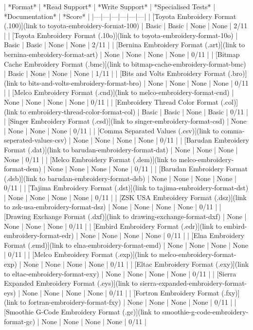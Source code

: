 \documentclass[a4paper, 11pt]{report}
\begin{document}
| *Format* | *Read Support* | *Write Support* | *Specialised Tests* | *Documentation* | *Score* |
|---|---|---|---|---|---|
| [Toyota Embroidery Format (.100)](link to toyota-embroidery-format-100) | Basic | Basic | None | None | 2/11 |
| [Toyota Embroidery Format (.10o)](link to toyota-embroidery-format-10o) | Basic | Basic | None | None | 2/11 |
| [Bernina Embroidery Format (.art)](link to bernina-embroidery-format-art) | None | None | None | None | 0/11 |
| [Bitmap Cache Embroidery Format (.bmc)](link to bitmap-cache-embroidery-format-bmc) | Basic | None | None | None | 1/11 |
| [Bits and Volts Embroidery Format (.bro)](link to bits-and-volts-embroidery-format-bro) | None | None | None | None | 0/11 |
| [Melco Embroidery Format (.cnd)](link to melco-embroidery-format-cnd) | None | None | None | None | 0/11 |
| [Embroidery Thread Color Format (.col)](link to embroidery-thread-color-format-col) | Basic | Basic | None | Basic | 0/11 |
| [Singer Embroidery Format (.csd)](link to singer-embroidery-format-csd) | None | None | None | None | 0/11 |
| [Comma Separated Values (.csv)](link to comma-seperated-values-csv) | None | None | None | None | 0/11 |
| [Barudan Embroidery Format (.dat)](link to barudan-embroidery-format-dat) | None | None | None | None | 0/11 |
| [Melco Embroidery Format (.dem)](link to melco-embroidery-format-dem) | None | None | None | None | 0/11 |
| [Barudan Embroidery Format (.dsb)](link to barudan-embroidery-format-dsb) | None | None | None | None | 0/11 |
| [Tajima Embroidery Format (.dst)](link to tajima-embroidery-format-dst) | None | None | None | None | 0/11 |
| [ZSK USA Embroidery Format (.dsz)](link to zsk-usa-embroidery-format-dsz) | None | None | None | None | 0/11 |
| [Drawing Exchange Format (.dxf)](link to drawing-exchange-format-dxf) | None | None | None | None | 0/11 |
| [Embird Embroidery Format (.edr)](link to embird-embroidery-format-edr) | None | None | None | None | 0/11 |
| [Elna Embroidery Format (.emd)](link to elna-embroidery-format-emd) | None | None | None | None | 0/11 |
| [Melco Embroidery Format (.exp)](link to melco-embroidery-format-exp) | None | None | None | None | 0/11 |
| [Eltac Embroidery Format (.exy)](link to eltac-embroidery-format-exy) | None | None | None | None | 0/11 |
| [Sierra Expanded Embroidery Format (.eys)](link to sierra-expanded-embroidery-format-eys) | None | None | None | None | 0/11 |
| [Fortron Embroidery Format (.fxy)](link to fortran-embroidery-format-fxy) | None | None | None | None | 0/11 |
| [Smoothie G-Code Embroidery Format (.gc)](link to smoothie-g-code-embroidery-format-gc) | None | None | None | None | 0/11 |
\end{document}
